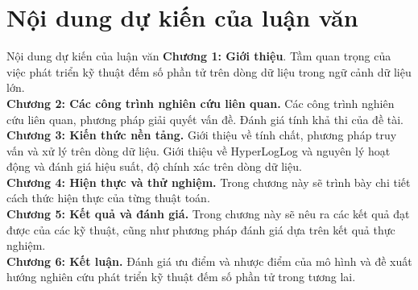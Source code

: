 \documentclass[10pt]{beamer}
\begin{document}
\section{Nội dung dự kiến của luận văn}
\begin{frame}{Nội dung dự kiến của luận văn}
  \textbf{Chương 1: Giới thiệu}. Tầm quan trọng của việc phát triển kỹ thuật đếm 
  số phần tử trên dòng dữ liệu trong ngữ cảnh 
  dữ liệu lớn.\\
  \textbf{Chương 2: Các công trình nghiên cứu liên quan.} Các công trình nghiên cứu 
  liên quan, phương pháp giải quyết vấn đề. Đánh giá tính khả thi của đề tài.\\
  \textbf{Chương 3: Kiến thức nền tảng.} Giới thiệu về tính chất, phương pháp
  truy vấn và xử lý trên dòng dữ liệu. Giới thiệu về HyperLogLog và nguyên lý 
  hoạt động và đánh giá hiệu suất, độ chính xác trên dòng dữ liệu.\\
  \textbf{Chương 4: Hiện thực và thử nghiệm. } Trong chương này sẽ trình bày chi tiết 
  cách thức hiện thực của từng thuật toán.\\
  \textbf{Chương 5: Kết quả và đánh giá.} Trong chương này sẽ nêu ra các kết quả 
  đạt được của các kỹ thuật, cũng như phương pháp đánh giá dựa trên kết quả thực nghiệm.\\
  \textbf{Chương 6: Kết luận.} Đánh giá ưu điểm và nhược điểm của mô hình và 
  đề xuất hướng nghiên cứu phát triển kỹ thuật đếm số phần tử trong tương lai.
\end{frame}
\end{document}
